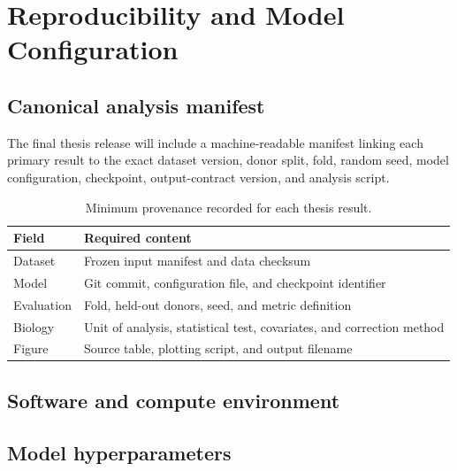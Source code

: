 \appendix
\makeatletter
{}
\makeatother
\renewcommand{\thechapter}{\Alph{chapter}}

\chapter{Reproducibility and Model Configuration} \label{chap:appendix-reproducibility}

\section{Canonical analysis manifest}

The final thesis release will include a machine-readable manifest linking each primary result to the exact dataset version, donor split, fold, random seed, model configuration, checkpoint, output-contract version, and analysis script.

\begin{table}[h!]
\centering
\begin{tabularx}{\textwidth}{l X}
\toprule
\textbf{Field} & \textbf{Required content} \\
\midrule
Dataset & Frozen input manifest and data checksum \\
Model & Git commit, configuration file, and checkpoint identifier \\
Evaluation & Fold, held-out donors, seed, and metric definition \\
Biology & Unit of analysis, statistical test, covariates, and correction method \\
Figure & Source table, plotting script, and output filename \\
\bottomrule
\end{tabularx}
\caption{Minimum provenance recorded for each thesis result.}
\label{tab:result-provenance}
\end{table}

\section{Software and compute environment}


\section{Model hyperparameters}


